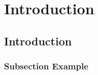 \let\textcircled=\pgftextcircled
\chapter{Introduction}
\label{chap:Currprac}

\section{Introduction}
\label{sec:sec01}

\subsection{Subsection Example}

